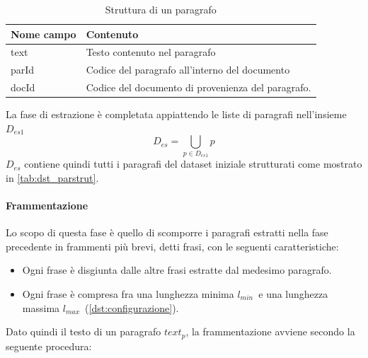 \begin{table}[H]
\centering
\begin{tabular}{ll}
\textbf{Nome campo} & \textbf{Contenuto} \\ \hline
text  & Testo contenuto nel paragrafo\\
parId & Codice del paragrafo all'interno del documento \\
docId & Codice del documento di provenienza del paragrafo.
\end{tabular}
\caption{Struttura di un paragrafo}
\label{tab:dst_parstrut}
\end{table}

La fase di estrazione è completata appiattendo le liste di paragrafi nell'insieme $D_{es1}$ 
\begin{equation}
D_{es} = \bigcup\limits_{p \in D_{es1}} p
\end{equation}
$D_{es}$ contiene quindi tutti i paragrafi del dataset iniziale strutturati come mostrato in \autoref{tab:dst_parstrut}.



\paragraph{Frammentazione}
Lo scopo di questa fase è quello di scomporre i paragrafi estratti nella fase precedente in frammenti più brevi, detti frasi, con le seguenti caratteristiche:
\newcommand{\lmin}{$l_{min}$}
\newcommand{\lmax}{$l_{max}$}
\begin{itemize}
\item Ogni frase è disgiunta dalle altre frasi estratte dal medesimo paragrafo.
\item Ogni frase è compresa fra una lunghezza minima \lmin\ e una lunghezza massima \lmax\ (\autoref{dst:configurazione}).
\end{itemize}

Dato quindi il testo di un paragrafo $text_p$, la frammentazione avviene secondo la seguente procedura:

